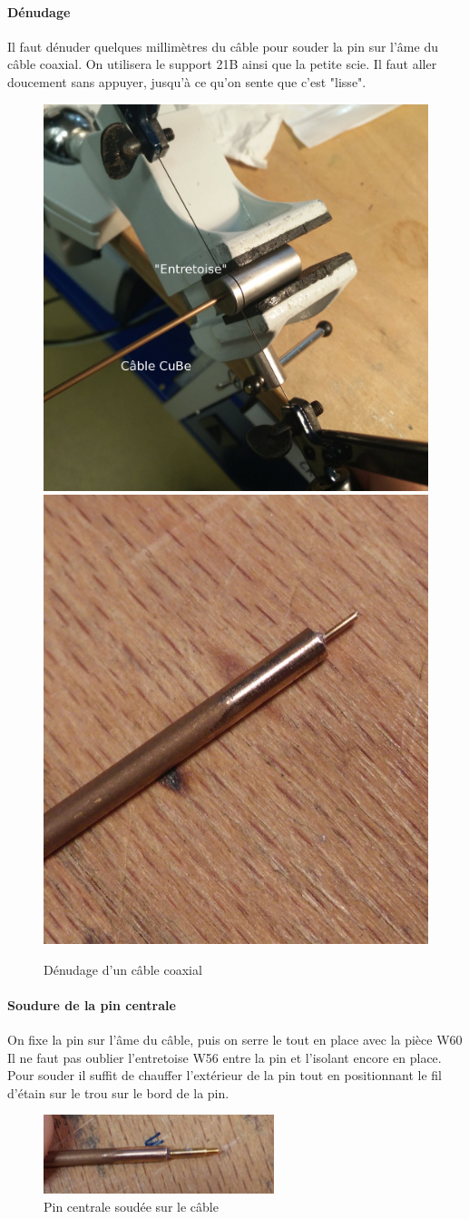 \documentclass[a4paper,11pt]{report}
\begin{document}
\paragraph*{Dénudage} Il faut dénuder quelques millimètres du câble pour souder la pin sur l’âme du
câble coaxial. On utilisera le support 21B ainsi que la petite scie. Il faut aller doucement
sans appuyer, jusqu’à ce qu’on sente que c’est "lisse".
\begin{figure}[h]
    \begin{center}
        \includegraphics[height=0.48\textwidth]{Images/Coax/1}
        \quad
        \includegraphics[height=0.48\textwidth]{Images/Coax/2}
        \caption{Dénudage d'un câble coaxial}
        \label{fig:}
    \end{center}
\end{figure}

\paragraph*{Soudure de la pin centrale} On fixe la pin sur l’âme du câble, puis on serre le tout en
place avec la pièce W60 Il ne faut pas oublier l’entretoise W56 entre la pin et l’isolant
encore en place.
Pour souder il suffit de chauffer l’extérieur de la pin tout en positionnant le fil d’étain sur
le trou sur le bord de la pin.
\begin{figure}[h]
    \begin{center}
        \includegraphics[width=0.60\textwidth]{Images/Coax/3}
        \caption{Pin centrale soudée sur le câble}
        \label{fig:}
    \end{center}
\end{figure}
\end{document}
